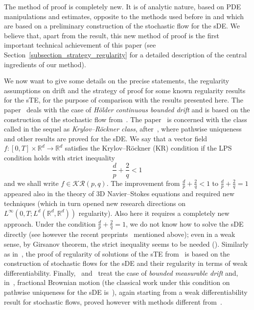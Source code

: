 \documentclass[a4paper,10pt]{article}
\newcommand\1{\mathbbm{1}}
\numberwithin{equation}{section}
\begin{document}
The method of proof is completely new. It is of analytic nature, based on PDE manipulations and estimates, opposite to the methods used before in \cite{FLAGUBPRI12,FEDFLA13a,MOHNILPRO15} and which are based on a preliminary construction of the stochastic flow for the sDE. We believe that, apart from the result, this new method of proof is the first important technical achievement of this paper (see Section~\ref{subsection_strategy_regularity} for a detailed description of the central ingredients of our method).

We now want to give some details on the precise statements, the regularity assumptions on drift and the strategy of proof for some known regularity results for the sTE, for the purpose of comparison with the results presented here. The paper~\cite{FLAGUBPRI12} deals with the case of \textit{H\"{o}lder continuous bounded drift} and is based on the construction of the stochastic flow from~\cite{FLAGUBPRI11}. The paper~\cite{FEDFLA13a} is concerned with the class called in the sequel as \textit{Krylov--R\"{o}ckner class}, after~\cite{KRYROE05}, where pathwise uniqueness and other results are proved for the sDE. We say that a vector field $f \colon [ 0,T] \times\mathbb{R}^{d}\rightarrow\mathbb{R}^{d}$ satisfies the Krylov--R\"{o}ckner (KR) condition if the LPS condition holds with strict inequality
\begin{equation*}
\frac{d}{p}+\frac{2}{q}<1  
\end{equation*}
and we shall write $f\in\mathcal{KR}(p,q)$. The improvement from $\frac{d}{p}+\frac{2}{q}<1$ to $\frac{d}{p}+\frac{2}{q}=1$ appeared also in the theory of 3D Navier--Stokes equations and required new techniques (which in turn opened new research directions on $L^{\infty}(0,T;L^{d}(\mathbb{R}^{d},\mathbb{R}^{d}) )$ regularity). Also here it requires a completely new approach. Under the condition $\frac{d}{p}+\frac {2}{q}=1$, we do not know how to solve the sDE directly (see however the recent preprints~\cite{NAM18,WLW17} mentioned above); even in a weak sense, by Girsanov theorem, the strict inequality seems to be needed (\cite{KRYROE05,PORTENKO90,GYOMAR01}). Similarly as in~\cite{FLAGUBPRI12}, the proof of regularity of solutions of the sTE from~\cite{FEDFLA13a} is based on the construction of stochastic flows for the sDE and their regularity in terms of weak differentiability. Finally,~\cite{MOHNILPRO15} and~\cite{NIL15} treat the case of \emph{bounded measurable drift} and, in~\cite{NIL15}, fractional Brownian motion (the classical work under this condition on pathwise uniqueness for the sDE is~\cite{VERETENNIKOV81}), again starting from a weak differentiability result for stochastic flows, proved however with methods different from~\cite{FEDFLA13a}.
\end{document}
